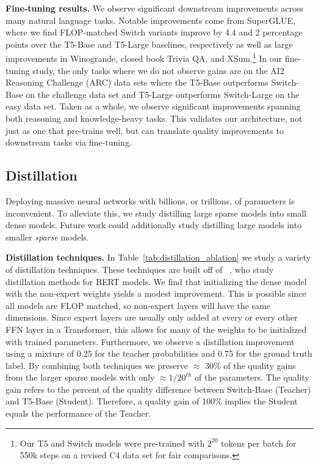 \documentclass[twoside,11pt]{article}
\begin{document}
\textbf{Fine-tuning results.} We observe significant downstream improvements across many natural language tasks.
Notable improvements come from SuperGLUE, where we find FLOP-matched Switch variants improve by 4.4 and 2 percentage points over the T5-Base and T5-Large baselines, respectively as well as large improvements in Winogrande, closed book Trivia QA, and XSum.\footnote{Our T5 and Switch models were pre-trained with $2^{20}$ tokens per batch for 550k steps on a revised C4 data set for fair comparisons.}
In our fine-tuning study, the only tasks where we do not observe gains are on the AI2 Reasoning Challenge (ARC) data sets where the T5-Base outperforms Switch-Base on the challenge data set and T5-Large outperforms Switch-Large on the easy data set.
Taken as a whole, we observe significant improvements spanning both reasoning and knowledge-heavy tasks.
This validates our architecture, not just as one that pre-trains well, but can translate quality improvements to downstream tasks via fine-tuning.





\subsection{Distillation}
Deploying massive neural networks with billions, or trillions, of parameters is inconvenient.
To alleviate this, we study distilling \citep{hinton2015distilling} large sparse models into small dense models. 
Future work could additionally study distilling large models into smaller \emph{sparse} models.

\textbf{Distillation techniques.}
In Table~\ref{tab:distillation_ablation} we study a variety of distillation techniques.
These techniques are built off of ~\cite{sanh2019distilbert}, who study distillation methods for BERT models.
We find that initializing the dense model with the non-expert weights yields a modest improvement. 
This is possible since all models are FLOP matched, so non-expert layers will have the same dimensions.
Since expert layers are usually only added at every or every other FFN layer in a Transformer, this allows for many of the weights to be initialized with trained parameters.
Furthermore, we observe a distillation improvement using a mixture of 0.25 for the teacher probabilities and 0.75 for the ground truth label.
By combining both techniques we preserve $\approx$ 30\% of the quality gains from the larger sparse models with only $\approx1/20^{th}$ of the parameters. 
The quality gain refers to the percent of the quality difference between Switch-Base (Teacher) and T5-Base (Student). 
Therefore, a quality gain of 100\% implies the Student equals the performance of the Teacher.
\end{document}
